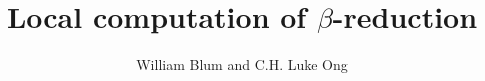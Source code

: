 

\title{Local computation of $\beta$-reduction}
\author{William Blum and C.H. Luke Ong}


\maketitle \tableofcontents \bigskip

\listoftodos
\bigskip








\printtodomargin
